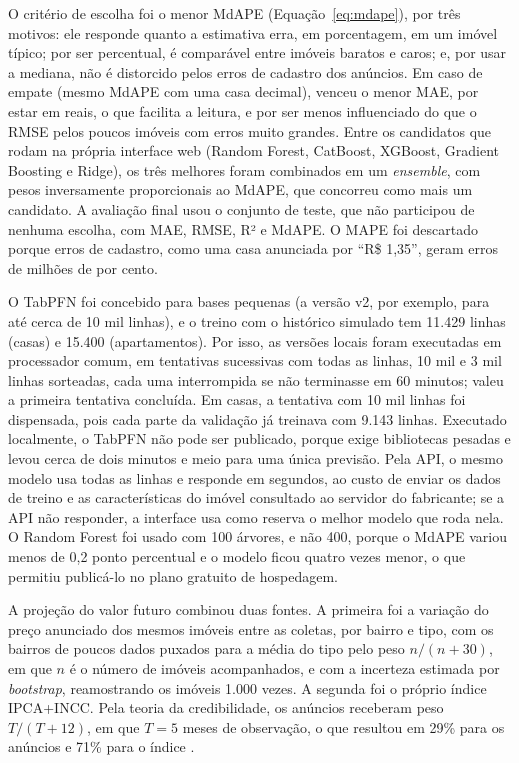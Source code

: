 \documentclass[
  article,
  a4paper,
  12pt,
  fleqn,
  oneside,
  chapter = TITLE,
  section = TITLE,
]{abntex2}
\begin{document}
O critério de escolha foi o menor MdAPE (Equação~\ref{eq:mdape}), por três motivos: ele responde quanto a estimativa erra, em porcentagem, em um imóvel típico; por ser percentual, é comparável entre imóveis baratos e caros; e, por usar a mediana, não é distorcido pelos erros de cadastro dos anúncios. Em caso de empate (mesmo MdAPE com uma casa decimal), venceu o menor MAE, por estar em reais, o que facilita a leitura, e por ser menos influenciado do que o RMSE pelos poucos imóveis com erros muito grandes. Entre os candidatos que rodam na própria interface web (Random Forest, CatBoost, XGBoost, Gradient Boosting e Ridge), os três melhores foram combinados em um \textit{ensemble}, com pesos inversamente proporcionais ao MdAPE, que concorreu como mais um candidato. A avaliação final usou o conjunto de teste, que não participou de nenhuma escolha, com MAE, RMSE, R² e MdAPE. O MAPE foi descartado porque erros de cadastro, como uma casa anunciada por ``R\$ 1,35'', geram erros de milhões de por cento.

O TabPFN foi concebido para bases pequenas (a versão v2, por exemplo, para até cerca de 10 mil linhas), e o treino com o histórico simulado tem 11.429 linhas (casas) e 15.400 (apartamentos). Por isso, as versões locais foram executadas em processador comum, em tentativas sucessivas com todas as linhas, 10 mil e 3 mil linhas sorteadas, cada uma interrompida se não terminasse em 60 minutos; valeu a primeira tentativa concluída. Em casas, a tentativa com 10 mil linhas foi dispensada, pois cada parte da validação já treinava com 9.143 linhas. Executado localmente, o TabPFN não pode ser publicado, porque exige bibliotecas pesadas e levou cerca de dois minutos e meio para uma única previsão. Pela API, o mesmo modelo usa todas as linhas e responde em segundos, ao custo de enviar os dados de treino e as características do imóvel consultado ao servidor do fabricante; se a API não responder, a interface usa como reserva o melhor modelo que roda nela. O Random Forest foi usado com 100 árvores, e não 400, porque o MdAPE variou menos de 0,2 ponto percentual e o modelo ficou quatro vezes menor, o que permitiu publicá-lo no plano gratuito de hospedagem.

A projeção do valor futuro combinou duas fontes. A primeira foi a variação do preço anunciado dos mesmos imóveis entre as coletas, por bairro e tipo, com os bairros de poucos dados puxados para a média do tipo pelo peso $n/(n+30)$, em que $n$ é o número de imóveis acompanhados, e com a incerteza estimada por \textit{bootstrap}, reamostrando os imóveis 1.000 vezes. A segunda foi o próprio índice IPCA+INCC. Pela teoria da credibilidade, os anúncios receberam peso $T/(T+12)$, em que $T = 5$ meses de observação, o que resultou em 29\% para os anúncios e 71\% para o índice \cite{buhlmann2005}.
\end{document}

